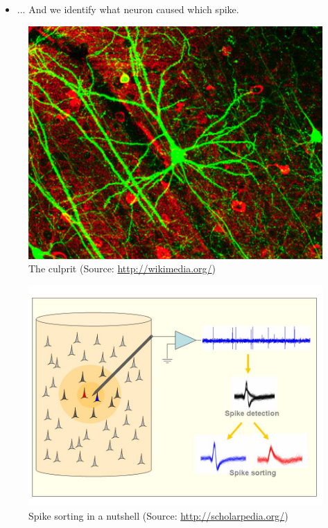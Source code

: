 \documentclass[11pt]{beamer}
\begin{document}
	\begin{frame}
		\begin{itemize}
			\item ... And we identify what neuron caused which spike.
		\end{itemize}
		\begin{figure}[p]
			\centering
			\includegraphics[scale=0.3]{images/GFPneuron.png}
			\caption{The culprit (Source: \url{http://wikimedia.org/})}
		\end{figure}
	\end{frame}
	\begin{frame}
		\begin{figure}[p]
			\centering
			\includegraphics[scale=0.3]{images/QQ_Fig1.jpg}
			\caption{Spike sorting in a nutshell (Source: \url{http://scholarpedia.org/})}
		\end{figure}
	\end{frame}
\end{document}
